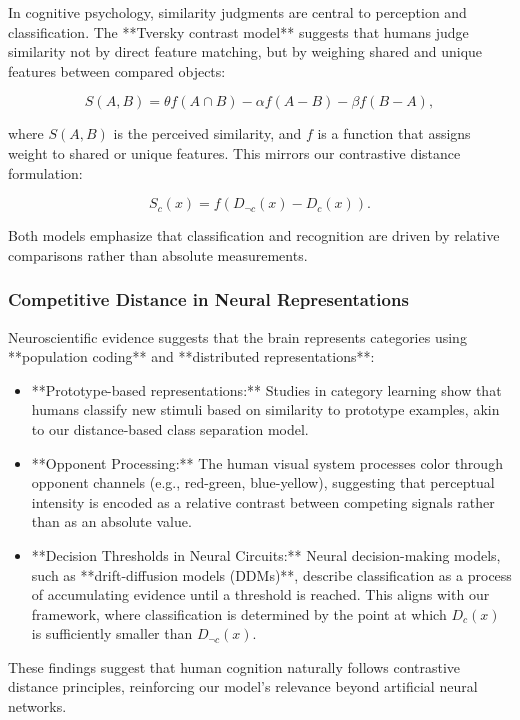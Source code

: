 In cognitive psychology, similarity judgments are central to perception and classification. The **Tversky contrast model** \cite{tversky1977features} suggests that humans judge similarity not by direct feature matching, but by weighing shared and unique features between compared objects:

\[
S(A, B) = \theta f(A \cap B) - \alpha f(A - B) - \beta f(B - A),
\]

where \( S(A, B) \) is the perceived similarity, and \( f \) is a function that assigns weight to shared or unique features. This mirrors our contrastive distance formulation:

\[
S_c(x) = f(D_{\neg c}(x) - D_c(x)).
\]

Both models emphasize that classification and recognition are driven by relative comparisons rather than absolute measurements.

\subsubsection{Competitive Distance in Neural Representations}

Neuroscientific evidence suggests that the brain represents categories using **population coding** and **distributed representations**:

\begin{itemize}
    \item **Prototype-based representations:** Studies in category learning show that humans classify new stimuli based on similarity to prototype examples, akin to our distance-based class separation model.
    \item **Opponent Processing:** The human visual system processes color through opponent channels (e.g., red-green, blue-yellow), suggesting that perceptual intensity is encoded as a relative contrast between competing signals rather than as an absolute value.
    \item **Decision Thresholds in Neural Circuits:** Neural decision-making models, such as **drift-diffusion models (DDMs)**, describe classification as a process of accumulating evidence until a threshold is reached. This aligns with our framework, where classification is determined by the point at which \( D_c(x) \) is sufficiently smaller than \( D_{\neg c}(x) \).
\end{itemize}

These findings suggest that human cognition naturally follows contrastive distance principles, reinforcing our model's relevance beyond artificial neural networks.


